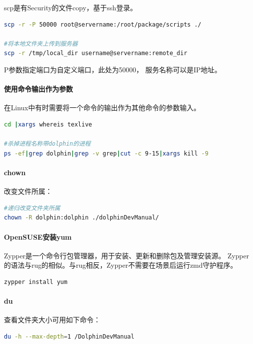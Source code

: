 \documentclass{book}
\begin{document}
scp是有Security的文件copy，基于ssh登录。 

\begin{lstlisting}[language=Bash]
scp -r -P 50000 root@servername:/root/package/scripts ./

#将本地文件夹上传到服务器
scp -r /tmp/local_dir username@servername:remote_dir
\end{lstlisting}

P参数指定端口为自定义端口，此处为50000，
服务名称可以是IP地址。

\paragraph{使用命令输出作为参数}

在Linux中有时需要将一个命令的输出作为其他命令的参数输入。

\begin{lstlisting}[language=Bash]
cd |xargs whereis texlive

#杀掉进程名称带dolphin的进程
ps -ef|grep dolphin|grep -v grep|cut -c 9-15|xargs kill -9
\end{lstlisting}

\paragraph{chown}

改变文件所属：

\begin{lstlisting}[language=Bash]
#递归改变文件夹所属
chown -R dolphin:dolphin ./dolphinDevManual/
\end{lstlisting}

\paragraph{OpenSUSE安装yum}

Zypper是一个命令行包管理器，用于安装、更新和删除包及管理安装源。
Zypper的语法与rug的相似。与rug相反，Zypper不需要在场景后运行zmd守护程序。

\begin{lstlisting}[language=Bash]
zypper install yum
\end{lstlisting}

\paragraph{du}

查看文件夹大小可用如下命令：

\begin{lstlisting}[language=Bash]
du -h --max-depth=1 /DolphinDevManual
\end{lstlisting}
\end{document}
